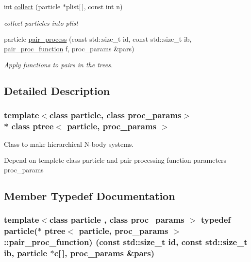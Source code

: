 \begin{DoxyCompactItemize}
int \hyperlink{classptree_a84576b8523ff7b4f90711fd18e6d0e22}{collect} (particle $\ast$plist\mbox{[}$\,$\mbox{]}, const int n)
\begin{DoxyCompactList}\small\item\em collect particles into plist \end{DoxyCompactList}\item 
particle \hyperlink{classptree_ac8d6f27b2accf46a78dd865093af7849}{pair\+\_\+process} (const std\+::size\+\_\+t id, const std\+::size\+\_\+t ib, \hyperlink{classptree_a5dce5bec8c21e2bfb68446434e95d21a}{pair\+\_\+proc\+\_\+function} f, proc\+\_\+params \&pars)
\begin{DoxyCompactList}\small\item\em Apply functions to pairs in the trees. \end{DoxyCompactList}\end{DoxyCompactItemize}


\subsection{Detailed Description}
\subsubsection*{template$<$class particle, class proc\+\_\+params$>$\\*
class ptree$<$ particle, proc\+\_\+params $>$}

Class to make hierarchical N-\/body systems. 

Depend on templete class particle and pair processing function parameters proc\+\_\+params 

\subsection{Member Typedef Documentation}
\subsubsection[{\texorpdfstring{pair\+\_\+proc\+\_\+function}{pair_proc_function}}]{\setlength{\rightskip}{0pt plus 5cm}template$<$class particle , class proc\+\_\+params $>$ typedef particle($\ast$ {\bf ptree}$<$ particle, proc\+\_\+params $>$\+::pair\+\_\+proc\+\_\+function) (const std\+::size\+\_\+t id, const std\+::size\+\_\+t ib, particle $\ast$c\mbox{[}$\,$\mbox{]}, proc\+\_\+params \&pars)}\hypertarget{classptree_a5dce5bec8c21e2bfb68446434e95d21a}{}\label{classptree_a5dce5bec8c21e2bfb68446434e95d21a}


